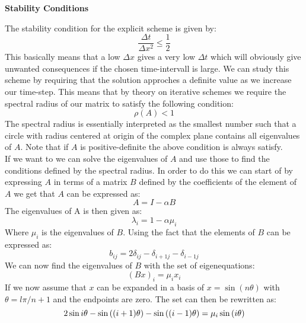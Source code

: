 \documentclass[a4paper,11pt]{article}
\newcommand{\vsp}{\vspace{0.2cm}}
\newcommand{\secti}[1]{\begin{center} \Large\bf{{#1}} \end{center}}
\begin{document}
\secti{Stability Conditions}
    The stability condition for the explicit scheme is given by:
    \begin{equation*}
        \frac{\Delta t}{\Delta x^2} \leq \frac{1}{2}
    \end{equation*}
    This basically means that a low $\Delta x$ gives a very low $\Delta t$ which will obviously give unwanted consequences if the chosen time-intervall is large. We can study this scheme by requiring that the solution approches a definite value as we increase our time-step. This means that by theory on iterative schemes we require the spectral radius of our matrix to satisfy the following condition:
    \begin{equation*}
        \rho(A) < 1
    \end{equation*}
    The spectral radius is essentially interpreted as the smallest number such that a circle with radius centered at origin of the complex plane contains all eigenvalues of $A$. Note that if $A$ is positive-definite the above condition is always satisfy.\vsp\\
    If we want to we can solve the eigenvalues of $A$ and use those to find the conditions defined by the spectral radius. In order to do this we can start of by expressing $A$ in terms of a matrix $B$ defined by the coefficients of the element of $A$ we get that $A$ can be expressed as:
    \begin{equation*}
        A = I - \alpha B
    \end{equation*}
    The eigenvalues of A is then given as:
    \begin{equation*}
        \lambda_i = 1 - \alpha \mu_i
    \end{equation*}
    Where $\mu_i$ is the eigenvalues of $B$. Using the fact that the elements of $B$ can be expressed as:
    \begin{equation*}
        b_{ij} = 2\delta_{ij} - \delta_{i+1j} - \delta_{i-1j}
    \end{equation*}
    We can now find the eigenvalues of $B$ with the set of eigenequations:
    \begin{equation*}
        (Bx)_i = \mu_i x_i
    \end{equation*}
    If we now assume that $x$ can be expanded in a basis of $x=\sin{(n\theta)}$ with $\theta =l\pi/n+1$ and the endpoints are zero. The set can then be rewritten as:
    \begin{equation*}
        2\sin{i\theta} - \sin{((i+1)\theta)} - \sin{((i-1)\theta)} = \mu_i\sin{(i\theta)}\\
    \end{equation*}
\end{document}

